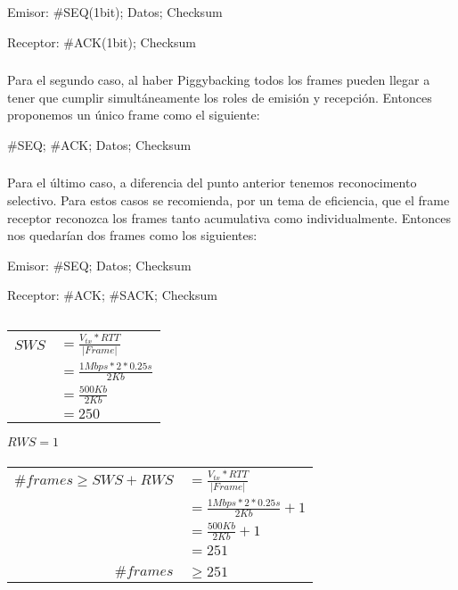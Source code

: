 Emisor: \#SEQ(1bit); Datos; Checksum

Receptor: \#ACK(1bit); Checksum

\subsubsection{}
Para el segundo caso, al haber Piggybacking todos los frames pueden llegar a tener que cumplir simultáneamente los roles de emisión y recepción. Entonces proponemos un único frame como el siguiente:

\#SEQ; \#ACK; Datos; Checksum

\subsubsection{}
Para el último caso, a diferencia del punto anterior tenemos reconocimento selectivo. Para estos casos se recomienda, por un tema de eficiencia, que el frame receptor reconozca los frames tanto acumulativa como individualmente. Entonces nos quedarían dos frames como los siguientes:

Emisor: \#SEQ; Datos; Checksum

Receptor: \#ACK; \#SACK; Checksum


\setcounter{subsection}{4}
\subsection{}

\subsubsection{}
\begin{tabular}{rl}
$SWS$ & $= \frac{V_{tx} * RTT}{|Frame|}$ \\
& $= \frac{1Mbps * 2 * 0.25s}{2Kb}$ \\
& $= \frac{500Kb}{2Kb}$ \\
& $= 250$ \\
\end{tabular}

$RWS = 1$

\subsubsection{}
\begin{tabular}{rl}
$\#frames \geq SWS + RWS$ & $= \frac{V_{tx} * RTT}{|Frame|}$ \\
& $= \frac{1Mbps * 2 * 0.25s}{2Kb} + 1$ \\
& $= \frac{500Kb}{2Kb} + 1$ \\
& $= 251$ \\ \\

$\#frames$ & $\geq 251$ \\
\end{tabular}

